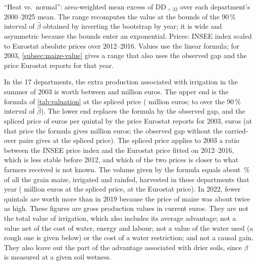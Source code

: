 \begin{table}[H]
\centering
\small
\caption{Production associated with irrigation in hot summers (17 departments, descriptive)}
\label{tab:valuation}
\begin{threeparttable}
{\setlength{\tabcolsep}{4pt}}
\begin{tablenotes}\footnotesize
\item ``Heat vs.\ normal'': area-weighted mean excess of $\mathrm{DD}_{>32}$ over each department's 2000--2025 mean. The range recomputes the value at the bounds of the 90\,\% interval of $\hat\beta$ obtained by inverting the bootstrap by year; it is wide and asymmetric because the bounds enter an exponential. Prices: INSEE index scaled to Eurostat absolute prices over 2012--2016. Values use the linear formula; for 2003, \cref{subsec:maize-value} gives a range that also uses the observed gap and the price Eurostat reports for that year.
\end{tablenotes}
\end{threeparttable}
\end{table}

In the 17 departments, the extra production associated with irrigation in the summer of 2003 is worth between \QoneValRangeLow{} and \QoneValRangeHigh{} million euros. The upper end is the formula of \cref{tab:valuation} at the spliced price (\QoneValTwoThousandThree{} million euros; \QoneValLow{} to \QoneValHigh{} over the 90\,\% interval of $\hat\beta$). The lower end replaces the formula by the observed gap, and the spliced price of \PriceRaccordThree{} euros per quintal by the price Eurostat reports for 2003, \PriceEurostatThree{} euros (at that price the formula gives \QoneValEurostat{} million euros; the observed gap without the carried-over pairs gives \QoneValObsNoRep{} at the spliced price). The spliced price applies to 2003 a ratio between the INSEE price index and the Eurostat price fitted on 2012--2016, which is less stable before 2012, and which of the two prices is closer to what farmers received is not known. The volume given by the formula equals about \ValShareTwoThousandThree\,\% of all the grain maize, irrigated and rainfed, harvested in these departments that year (\ProdValTwoThousandThree{} million euros at the spliced price, \ProdValTwoThousandThreeEurostat{} at the Eurostat price). In 2022, fewer quintals are worth more than in 2019 because the price of maize was about twice as high. These figures are gross production values in current euros. They are not the total value of irrigation, which also includes its average advantage; not a value net of the cost of water, energy and labour; not a value of the water used (a rough one is given below) or the cost of a water restriction; and not a causal gain. They also leave out the part of the advantage associated with drier soils, since $\beta$ is measured at a given soil wetness.

